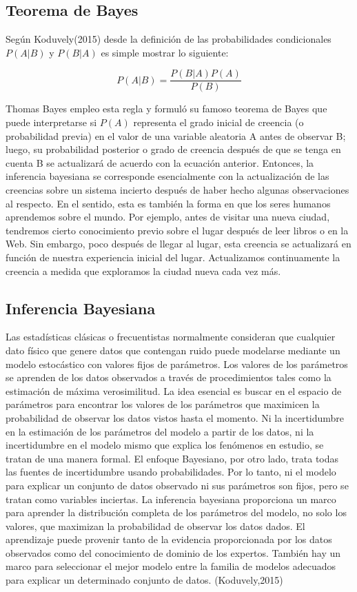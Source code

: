 \subsection{Teorema de Bayes}
Según Koduvely(2015) desde la definición de las probabilidades condicionales $P\left(A|B\right)$ y $P\left(B|A\right)$ es simple mostrar lo siguiente:

\[P\left(A|B\right)=\frac{P\left(B|A\right)P\left(A\right)}{P\left(B\right)}
\]

Thomas Bayes empleo esta regla y formuló su famoso teorema de Bayes que puede interpretarse si $P\left(A\right)$ representa el grado inicial de creencia (o probabilidad previa) en el valor de una variable aleatoria A antes de observar B; luego, su probabilidad posterior o grado de creencia después de que se tenga en cuenta B se actualizará de acuerdo con la ecuación anterior. Entonces, la inferencia bayesiana se corresponde esencialmente con la actualización de las creencias sobre un sistema incierto después de haber hecho algunas observaciones al respecto. En el sentido, esta es también la forma en que los seres humanos aprendemos sobre el mundo. Por ejemplo, antes de visitar una nueva ciudad, tendremos cierto conocimiento previo sobre el lugar después de leer libros o en la Web. Sin embargo, poco después de llegar al lugar, esta creencia se actualizará en función de nuestra experiencia inicial del lugar. Actualizamos continuamente la creencia a medida que exploramos la ciudad nueva cada vez más.

\subsection{Inferencia Bayesiana}
Las estadísticas clásicas o frecuentistas normalmente consideran que cualquier dato físico que genere datos que contengan ruido puede modelarse mediante un modelo estocástico con valores fijos de parámetros. Los valores de los parámetros se aprenden de los datos observados a través de procedimientos tales como la estimación de máxima verosimilitud. La idea esencial es buscar en el espacio de parámetros para encontrar los valores de los parámetros que maximicen la probabilidad de observar los datos vistos hasta el momento. Ni la incertidumbre en la estimación de los parámetros del modelo a partir de los datos, ni la incertidumbre en el modelo mismo que explica los fenómenos en estudio, se tratan de una manera formal. El enfoque Bayesiano, por otro lado, trata todas las fuentes de incertidumbre usando probabilidades. Por lo tanto, ni el modelo para explicar un conjunto de datos observado ni sus parámetros son fijos, pero se tratan como variables inciertas. La inferencia bayesiana proporciona un marco para aprender la distribución completa de los parámetros del modelo, no solo los valores, que maximizan la probabilidad de observar los datos dados. El aprendizaje puede provenir tanto de la evidencia proporcionada por los datos observados como del conocimiento de dominio de los expertos. También hay un marco para seleccionar el mejor modelo entre la familia de modelos adecuados para explicar un determinado conjunto de datos. (Koduvely,2015)



